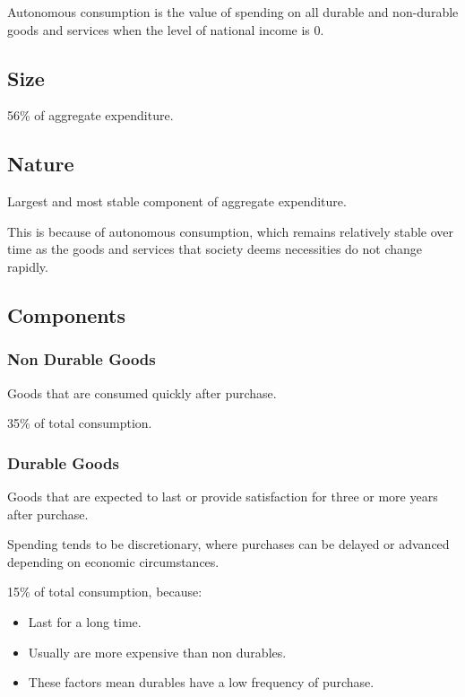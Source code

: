 \documentclass[a4paper,11pt]{article}
\begin{document}
Autonomous consumption is the value of spending on all durable and non-durable
goods and services when the level of national income is 0.


\subsection{Size}

56\% of aggregate expenditure.


\subsection{Nature}

Largest and most stable component of aggregate expenditure.

This is because of autonomous consumption, which remains relatively stable over
time as the goods and services that society deems necessities do not change
rapidly.


\subsection{Components}

\subsubsection{Non Durable Goods}

Goods that are consumed quickly after purchase.

35\% of total consumption.


\subsubsection{Durable Goods}

Goods that are expected to last or provide satisfaction for three or more
years after purchase.

Spending tends to be discretionary, where purchases can be delayed or advanced
depending on economic circumstances.

15\% of total consumption, because:

\begin{itemize}
\item Last for a long time.
\item Usually are more expensive than non durables.
\item These factors mean durables have a low frequency of purchase.
\end{itemize}
\end{document}

